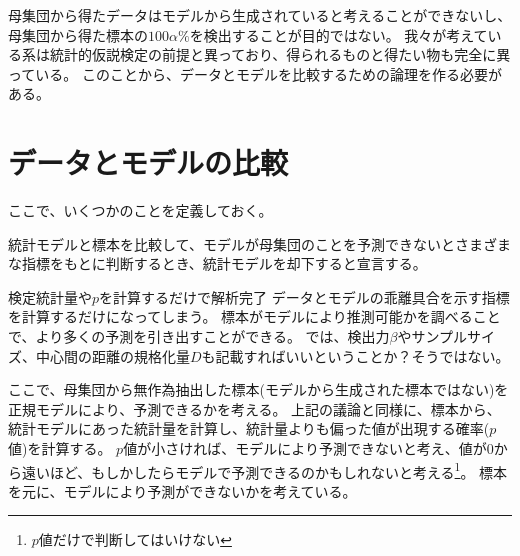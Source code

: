 母集団から得たデータはモデルから生成されていると考えることができないし、母集団から得た標本の$100\alpha\%$を検出することが目的ではない。
我々が考えている系は統計的仮説検定の前提と異っており、得られるものと得たい物も完全に異っている。
このことから、データとモデルを比較するための論理を作る必要がある。




\section{データとモデルの比較}
ここで、いくつかのことを定義しておく。
\begin{defi}
    統計モデルと標本を比較して、モデルが母集団のことを予測できないとさまざまな指標をもとに判断するとき、統計モデルを却下すると宣言する。
\end{defi}

\begin{SMbox}{検定統計量や$p$を計算するだけで解析完了}
 データとモデルの乖離具合を示す指標を計算するだけになってしまう。
 標本がモデルにより推測可能かを調べることで、より多くの予測を引き出すことができる。
 では、検出力$\beta$やサンプルサイズ、中心間の距離の規格化量$D$も記載すればいいということか？そうではない。
\end{SMbox}


ここで、母集団から無作為抽出した標本(モデルから生成された標本ではない)を正規モデルにより、予測できるかを考える。
上記の議論と同様に、標本から、統計モデルにあった統計量を計算し、統計量よりも偏った値が出現する確率($p$値)を計算する。
$p$値が小さければ、モデルにより予測できないと考え、値が0から遠いほど、もしかしたらモデルで予測できるのかもしれないと考える\footnote{$p$値だけで判断してはいけない}。
標本を元に、モデルにより予測ができないかを考えている。

